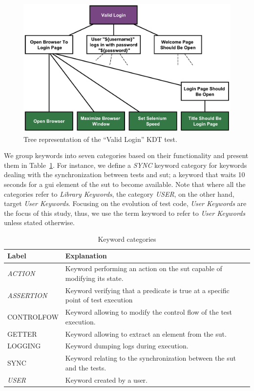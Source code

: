 \begin{figure}
\centering
\includegraphics[width=0.7\columnwidth]{figures/evolution/robotframework_tree.pdf}
\caption{Tree representation of the ``Valid Login'' KDT test.}
\label{fig:robotframework_tree}
\end{figure}

We group keywords into seven categories based on their functionality and present them in Table~\ref{keywords_categories}. For instance, we define a \emph{SYNC} keyword category for keywords dealing with the synchronization between tests and \gls{sut}; \eg a keyword that waits 10 seconds for a \gls{gui} element of the \gls{sut} to become available. Note that where all the categories refer to \emph{Library Keywords}, the category \emph{USER}, on the other hand, target \emph{User Keywords}. Focusing on the evolution of test code, \emph{User Keywords} are the focus of this study, thus, we use the term keyword to refer to \emph{User Keywords} unless stated otherwise.

\begin{table}
\caption{Keyword categories}
\label{keywords_categories}
\centering
\begin{tabular}{>{\raggedright}m{0.9in}>{\raggedright}m{4in}}
\toprule
\textbf{\scriptsize{Label}} & \textbf{\scriptsize{Explanation}}\tabularnewline
\toprule

\scriptsize{\textit{ACTION}} & \scriptsize{Keyword performing an action on the
\gls{sut} capable of modifying its state.} \tabularnewline

\scriptsize{\textit{ASSERTION}} & \scriptsize{Keyword verifying that a predicate
is true at a specific point of test execution} \tabularnewline

\scriptsize{CONTROLFOW} & \scriptsize{Keyword allowing to modify the
                                   control flow of the test execution.} \tabularnewline

\scriptsize{GETTER} & \scriptsize{Keyword allowing to extract an element from
the \gls{sut}.} \tabularnewline

\scriptsize{LOGGING} & \scriptsize{Keyword dumping logs during execution.}
\tabularnewline

\scriptsize{SYNC} & \scriptsize{Keyword relating to the
                                  synchronization between the \gls{sut} and the tests.} \tabularnewline

\scriptsize{\textit{USER}} & \scriptsize{Keyword created by a user.}
\tabularnewline

\bottomrule
\end{tabular}
\end{table}

